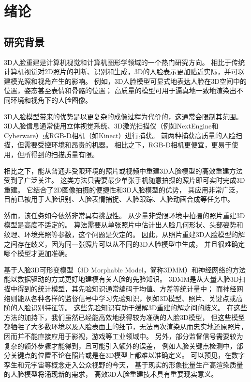 \chapter{绪论}
\label{chap:intro}

\section{研究背景}

3D人脸重建是计算机视觉和计算机图形学领域的一个热门研究方向。
相比于传统计算机视觉对2D照片的判断、识别和生成，3D的人脸表示更加贴近实际，并可以建模光照和视角产生的影响。
例如，3D人脸模型可显式地表达人脸在3D空间中的位置，姿态甚至表情和骨骼的位置；
高质量的模型可用于逼真地一致地渲染出不同环境和视角下的人脸图像。

3D人脸模型带来的优势是以更复杂的成像过程为代价的，这通常会限制其范围。
3D人脸信息通常使用立体视觉系统\citep{DEP,ss_geo}、3D激光扫描仪（例如NextEngine和Cyberware）或RGB-D相机（如Kinect）进行捕获。
前两种捕获高质量的人脸扫描，但需要受控环境和昂贵的机器。
相比之下，RGB-D相机更便宜，更易于使用，但所得到的扫描质量有限。

相比之下，能从普通非受限环境的照片或视频中重建3D人脸模型的高效重建方法受到了广泛关注。
这类方法只需要最少单张手机随意拍摄的照片即可实时完成3D重建。
它结合了2D图像拍摄的便捷性和3D人脸模型的优势，
其应用非常广泛，目前已被用于人脸识别\citep{BlanzV03,1022631413.nh,zhu2015high}、人脸表情捕捉\cite{Mo2022TowardsAF}、人脸跟踪\citep{Pham2016RobustRP}、人脸动画合成\citep{Cao20133DSR,thies2016face2face}等任务中。

然而，该任务如今依然非常具有挑战性。
从少量非受限环境中拍摄的照片重建3D模型是高度不适定的。
算法需要从单张照片中估计出人脸几何形状、头部姿势和纹理、环境光照等参数，这个问题是欠定的。
因此，从照片重建3D人脸模型的解之间存在歧义，因为同一张照片可以从不同的3D人脸模型中生成，
并且很难确定哪个模型才更加准确。

基于人脸3D可形变模型（3D Morphable Model，简称3DMM）和神经网络的方法能以数据驱动的方式更好地建模有关人脸的先验知识。
3DMM是从大量人脸3D扫描中得到的统计模型，其先验知识通常编码于均值、方差等统计量中；
而神经网络则能从各种各样的监督信号中学习先验知识，例如3D模型、照片、关键点或高阶的人脸识别特征等。
这些先验知识有助于缓解3D重建的解之间的歧义。
在这些方法的加持下，我们虽然已经能高效地获得较为准确的人脸3D模型，
但这些模型都牺牲了大多数环境以及人脸表面上的细节，无法再次渲染从而忠实地还原照片，
因而并不能直接应用于影视，游戏等工业领域中。
另外，部分监督信号需要较为复杂的额外步骤才能得到，且可能引入额外的误差，
例如人脸关键点检测中，部分关键点的位置不论在照片或是在3D模型上都难以准确定义。
可以预见，在数字孪生和元宇宙等概念走入公众视野的今天，
基于现实的形象批量生产高渲染质量的人脸模型将涌现新的需求，
高效3D人脸重建技术具有重要现实意义。

